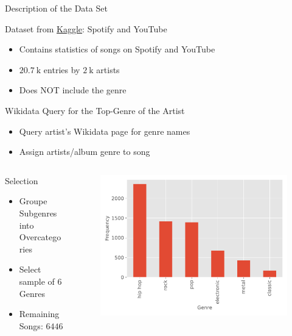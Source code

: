\begin{frame}{Description of the Data Set}
    \begin{alertblock}{Dataset from \href{https://www.kaggle.com/datasets/salvatorerastelli/spotify-and-youtube}{Kaggle}: Spotify and YouTube}
      \begin{itemize}
        \item Contains statistics of songs on Spotify and YouTube
        \item $\SI{20.7}{\kilo}$ entries by $\SI{2}{\kilo}$ artists
        \item Does \alert{NOT} include the genre
      \end{itemize}
    \end{alertblock}
    \begin{alertblock}{Wikidata Query for the Top-Genre of the Artist}
      \begin{itemize}
       \item Query artist's Wikidata page for genre names
       \item Assign artists/album genre to song
      \end{itemize}
    \end{alertblock}
    \begin{columns}[T]
        \begin{column}{0.4\textwidth}
            \begin{alertblock}{Selection}
                \begin{itemize}
                    \item Groupe Subgenres into Overcategories
                    \item Select sample of $\num{6}$ Genres
                    \item Remaining Songs: $\num{6446}$
                \end{itemize}
            \end{alertblock}
        \end{column}
        \begin{column}{0.6\textwidth}
            \begin{figure}
                \hspace*{-1.7cm}
                \includegraphics[width=1.1\textwidth]{../figures/genre_hist.pdf}

\end{figure}
\end{column}
\end{columns}
\end{frame}
